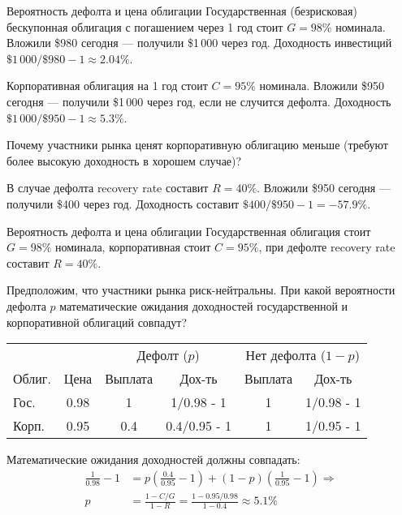 \documentclass{beamer}
\begin{document}
\begin{frame}{Вероятность дефолта и цена облигации}
\justify
Государственная (безрисковая) бескупонная облигация с погашением через 1 год стоит $G=98\%$ номинала. Вложили \$980 сегодня --- получили \$1\,000 через год. Доходность инвестиций $\$1\,000 / \$980 - 1 \approx 2.04\%$.

\justify
Корпоративная облигация на 1 год стоит $C=95\%$ номинала. Вложили \$950 сегодня --- получили \$1\,000 через год, если не случится дефолта. Доходность $\$1\,000 / \$950 - 1 \approx 5.3\%$.

\justify
Почему участники рынка ценят корпоративную облигацию меньше (требуют более высокую доходность в хорошем случае)?

\justify
В случае дефолта recovery rate составит $R=40\%$. Вложили \$950 сегодня --- получили \$400 через год. Доходность составит $\$400 / \$950 - 1 = -57.9\%$.
\end{frame}



\begin{frame}{Вероятность дефолта и цена облигации}
\justify
Государственная облигация стоит $G=98\%$ номинала, корпоративная стоит $C=95\%$, при дефолте recovery rate составит $R=40\%$.

\justify
Предположим, что участники рынка риск-нейтральны. При какой вероятности дефолта $p$ математические ожидания доходностей государственной и корпоративной облигаций совпадут?

\centering
\begin{tabular}{l|c|c|c|c|c}
& & \multicolumn{2}{c|}{Дефолт ($p$)} & \multicolumn{2}{c}{Нет дефолта ($1-p$)} \\
Облиг. & Цена & Выплата & Дох-ть & Выплата & Дох-ть \\
\hline
Гос.  & 0.98 & 1     & 1/0.98 - 1 & 1 & 1/0.98 - 1\\
Корп. & 0.95 & 0.4 & 0.4/0.95 - 1 & 1 & 1/0.95 - 1
\end{tabular}

\justify
Математические ожидания доходностей должны совпадать:
\begin{align*}
\frac{1}{0.98} - 1 &= p\left(\frac{0.4}{0.95} - 1\right) + (1-p)\left(\frac{1}{0.95} - 1\right) \Rightarrow \\
p &= \frac{1 - C/G}{1-R} = \frac{1 - 0.95/0.98}{1-0.4} \approx 5.1\%
\end{align*}
\end{frame}
\end{document}
